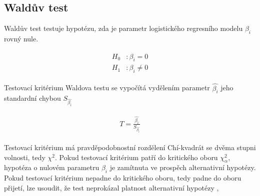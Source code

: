 \subsection{Waldův test}
Waldův test testuje hypotézu, zda je parametr logistického regresního modelu $\beta_i$ rovný nule.

\begin{align}
    \begin{split}
        H_0 &: \beta_i = 0 \\
        H_1 &: \beta_i \neq 0
    \end{split}
\end{align}

Testovací kritérium Waldova testu se vypočítá vydělením parametr $\hat{\beta_i}$ jeho standardní chybou $S_{\hat{\beta_i}}$

\begin{align}
    \begin{split}
        T = \frac{\hat{\beta_i}}{S_{\hat{\beta_i}}}
    \end{split}
\end{align}

Testovací kritérium má pravděpodobnostní rozdělení Chí-kvadrát se dvěma stupni volnosti, tedy $\chi^2$. Pokud testovací kritérium patří do 
kritického oboru $\chi^2_\alpha$, hypotéza o nulovém parametru $\beta_i$ je zamítnuta ve prospěch alternativní hypotézy. Pokud testovací kritérium nepadne do kritického oboru,
tedy padne do oboru přijetí, lze usoudit, že test neprokázal platnost alternativní hypotézy \cite{kleinbaum_logistic_2010}, \cite{powers_statistical_2000}